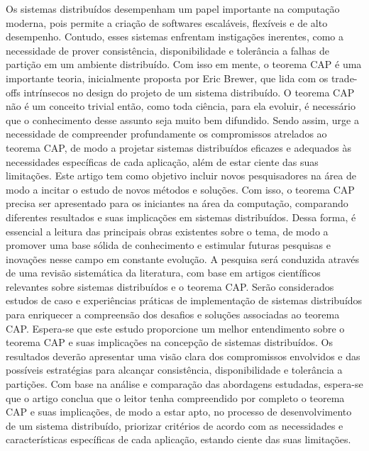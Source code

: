 
\begin{resumoutfpr}%
Os sistemas distribuídos desempenham um papel importante na computação moderna, pois permite a criação de softwares escaláveis, flexíveis e de alto desempenho. Contudo, esses sistemas enfrentam instigações inerentes, como a necessidade de prover consistência, disponibilidade e tolerância a falhas de partição em um ambiente distribuído. Com isso em mente, o teorema CAP é uma importante teoria, inicialmente proposta por Eric Brewer, que lida com os trade-offs intrínsecos no design do projeto de um sistema distribuído.
O teorema CAP não é um conceito trivial então, como toda ciência, para ela evoluir, é necessário que o conhecimento desse assunto seja muito bem difundido. Sendo assim, urge a necessidade de compreender profundamente os compromissos atrelados ao teorema CAP, de modo a projetar sistemas distribuídos eficazes e adequados às necessidades específicas de cada aplicação, além de estar ciente das suas limitações.
Este artigo tem como objetivo incluir novos pesquisadores na área de modo a incitar o estudo de novos métodos e soluções. Com isso, o teorema CAP precisa ser apresentado para os iniciantes na área da computação, comparando diferentes resultados e suas implicações em sistemas distribuídos. Dessa forma, é essencial a leitura das principais obras existentes sobre o tema, de modo a promover uma base sólida de conhecimento e estimular futuras pesquisas e inovações nesse campo em constante evolução. 
A pesquisa será conduzida através de uma revisão sistemática da literatura, com base em artigos científicos relevantes sobre sistemas distribuídos e o teorema CAP. Serão considerados estudos de caso e experiências práticas de implementação de sistemas distribuídos para enriquecer a compreensão dos desafios e soluções associadas ao teorema CAP. 
Espera-se que este estudo proporcione um melhor entendimento sobre o teorema CAP e suas implicações na concepção de sistemas distribuídos. Os resultados deverão apresentar uma visão clara dos compromissos envolvidos e das possíveis estratégias para alcançar consistência, disponibilidade e tolerância a partições.
Com base na análise e comparação das abordagens estudadas, espera-se que o artigo conclua que o leitor tenha compreendido por completo o teorema CAP e suas implicações, de modo a estar apto, no processo de desenvolvimento de um sistema distribuído, priorizar critérios de acordo com as necessidades e características específicas de cada aplicação, estando ciente das suas limitações. 
\end{resumoutfpr}
